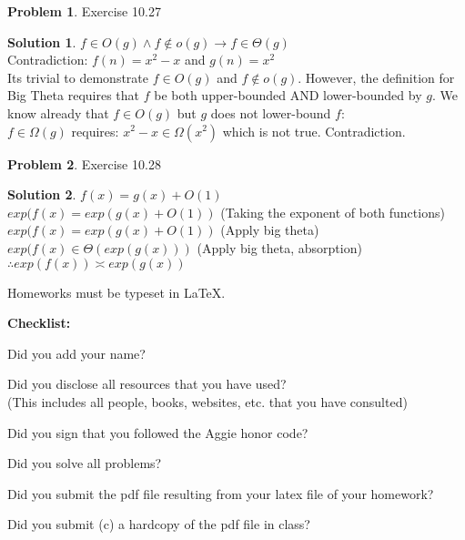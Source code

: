 \documentclass{article}
\theoremstyle{definition}
\newtheorem{problem}{Problem}
\newtheorem*{solution}{Solution}
\newcommand{\checklist}{\noindent\textbf{Checklist:}
\begin{compactitem}[$\Box$] 
\item Did you add your name? 
\item Did you disclose all resources that you have used? \\
(This includes all people, books, websites, etc. that you have consulted)
\item Did you sign that you followed the Aggie honor code? 
\item Did you solve all problems? 
\item Did you submit the pdf file resulting from your latex file
  of your homework?
\item Did you submit (c) a hardcopy of the pdf file in class? 
\end{compactitem}
}
\begin{document}
\begin{problem}
Exercise 10.27
\begin{solution} $f \in O(g) \land f \notin o(g) \rightarrow f \in \Theta(g)$\\
Contradiction: $f(n) = x^2 - x$ and $g(n) = x^2$\\
Its trivial to demonstrate $f \in O(g)$ and $f \notin o(g)$. However, the definition for Big Theta requires that $f$ be both upper-bounded AND lower-bounded by $g$. We know already that $f \in O(g)$ but $g$ does not lower-bound $f$:\\
$f \in \Omega(g)$ requires: $x^2 -x \in \Omega(x^2)$ which is not true. Contradiction.
\end{solution}
\end{problem}

\begin{problem}
Exercise 10.28
\begin{solution}
$f(x) = g(x) + O(1)$\\
$exp(f(x) = exp(g(x) + O(1))$ (Taking the exponent of both functions)\\
$exp(f(x) = exp(g(x) + O(1))$ (Apply big theta)\\
$exp(f(x) \in \Theta(exp(g(x)))$ (Apply big theta, absorption)\\
$\therefore exp(f(x)) \asymp exp(g(x))$
\end{solution}
\end{problem}





Homeworks must be typeset in \LaTeX{}. 









\goodbreak
\checklist
\end{document}
